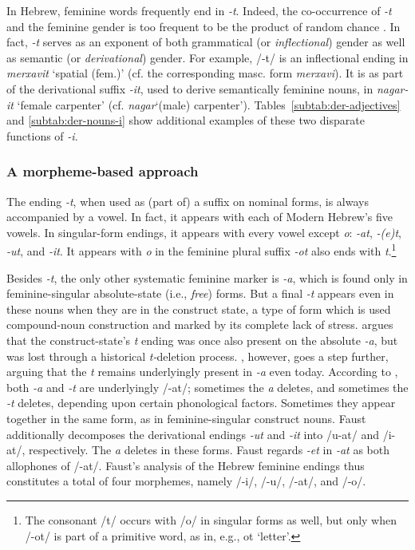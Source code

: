 In Hebrew, feminine words frequently 
end in \textit{-t}. Indeed, the co-occurrence of \textit{-t} and the feminine gender is 
too frequent to be the product of random chance \citep{faust:2013}.
In fact, \textit{-t} serves as an exponent of both grammatical (or \emph{inflectional}) 
gender as well as semantic (or \emph{derivational}) gender. For example, /-t/ 
is an inflectional ending in \textit{merxavit} `spatial (fem.)' 
(cf. the corresponding masc. form \textit{merxavi}). 
It is as part of the derivational suffix \textit{-it}, used to 
derive semantically feminine nouns, in \textit{nagar-it} 
`female carpenter' (cf. \textit{nagar}`(male) carpenter'). 
Tables~\ref{subtab:der-adjectives} and \ref{subtab:der-nouns-i} 
show additional
examples of these two disparate functions of \textit{-i}.

\subsubsection{A morpheme-based approach}
The ending \textit{-t}, when used as (part of) a suffix on 
nominal forms, is always accompanied by a vowel. 
In fact, it appears with each of Modern Hebrew's five vowels.
In singular-form endings, it appears with every vowel except 
\textit{o}: \textit{-at}, \textit{-(e)t}, \textit{-ut}, and \textit{-it}. 
It appears with \textit{o} in the feminine plural suffix \textit{-ot} 
also ends with \textit{t}.\footnote{The consonant /t/ occurs with 
/o/ in singular forms as well, but only when /-ot/ is part of a 
primitive word, as in, e.g., ot `letter'.}

Besides \textit{-t}, the only other systematic feminine marker is 
\textit{-a}, which is found only 
in feminine-singular absolute-state (i.e., \emph{free}) forms. %
But a final \textit{-t} appears even in these nouns when they are 
in the construct state, a type of form which is used compound-noun 
construction and marked by its complete lack of stress.
\cite{schwarzwald:1982} argues that
the construct-state's \textit{t} ending was once also 
present on the absolute \textit{-a}, but was lost through a historical
\textit{t-}deletion process. \cite{faust:2013}, however, 
goes a step further, arguing that the \textit{t} remains 
underlyingly present in \textit{-a} even today. According 
to \cite{faust:2013}, both
\textit{-a} and \textit{-t} are underlyingly /-at/; sometimes 
the \textit{a} deletes, and sometimes the \textit{-t} deletes, depending 
upon certain phonological factors. Sometimes they appear 
together in the same form, as in feminine-singular construct nouns.
 Faust additionally decomposes the derivational endings 
\textit{-ut} and \textit{-it} into /u-at/ and /i-at/, respectively. 
The \textit{a} deletes in these forms.
Faust regards \textit{-et} in \textit{-at} as both allophones of /-at/. 
Faust's analysis of the Hebrew feminine endings thus constitutes a total of 
four morphemes, namely /-i/, /-u/, /-at/, and /-o/.
    
